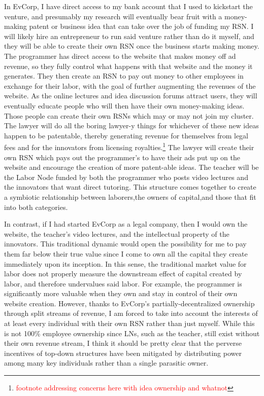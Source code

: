 \documentclass{article}[10pt]
\begin{document}
In EvCorp, I have direct access to my bank account that I used to kickstart the venture, and presumably my research will eventually bear fruit with a money-making patent or business idea that can take over the job of funding my RSN.
I will likely hire an entrepreneur to run said venture rather than do it myself, and they will be able to create their own RSN once the business starts making money.
The programmer has direct access to the website that makes money off ad revenue, so they fully control what happens with that website and the money it generates.
They then create an RSN to pay out money to other employees in exchange for their labor, with the goal of further augmenting the revenues of the website.
As the online lectures and idea discussion forums attract users, they will eventually educate people who will then have their own money-making ideas.
Those people can create their own RSNs which may or may not join my cluster.
The lawyer will do all the boring lawyer-y things for whichever of these new ideas happen to be patentable, thereby generating revenue for themselves from legal fees and for the innovators from licensing royalties.\footnote{
    \textcolor{red}{footnote addressing concerns here with idea ownership and whatnot}}
The lawyer will create their own RSN which pays out the programmer's to have their ads put up on the website and encourage the creation of more patent-able ideas.
The teacher will be the Labor Node funded by both the programmer who posts video lectures and the innovators that want direct tutoring.
This structure comes together to create a symbiotic relationship between laborers,\footnotemark the owners of capital,\footnotemark and those that fit into both categories.\footnotemark \par
{}

In contrast, if I had started EvCorp as a legal company, then I would own the website, the teacher's video lectures, and the intellectual property of the innovators.
This traditional dynamic would open the possibility for me to pay them far below their true value since I come to own all the capital they create immediately upon its inception.
In this sense, the traditional market value for labor does not properly measure the downstream effect of capital created by labor, and therefore undervalues said labor.
For example, the programmer is significantly more valuable when they own and stay in control of their own website creation.
However, thanks to EvCorp's partially-decentralized ownership through split streams of revenue, I am forced to take into account the interests of at least every individual with their own RSN rather than just myself.
While this is not 100\% employee ownership since LNs, such as the teacher, still exist without their own revenue stream, I think it should be pretty clear that the perverse incentives of top-down structures have been mitigated by distributing power among many key individuals rather than a single parasitic owner. 

\hline
\vspace{0.1in}
\end{document}
